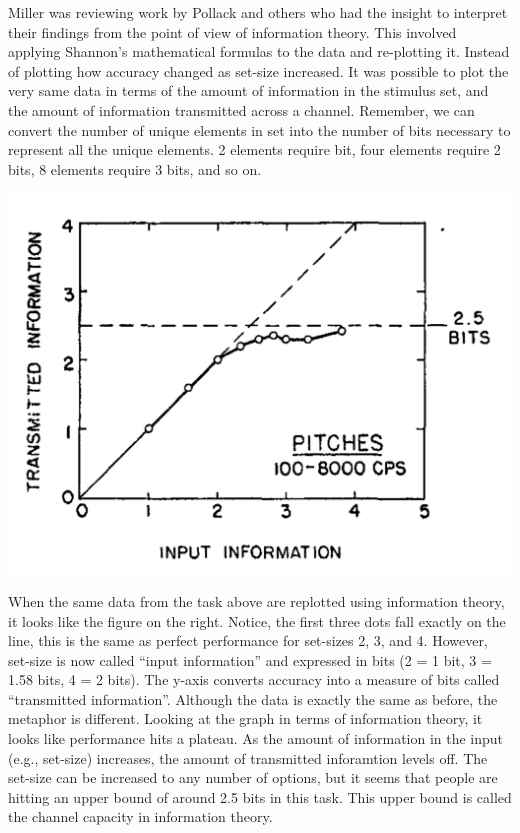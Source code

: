 \documentclass[
  oneside,
  12pt]{crumpbook}
\newenvironment{floatright50}{%
  \wrapfigure{R}{.5\textwidth}%
  }{%
  \endwrapfigure}
\begin{document}
Miller was reviewing work by Pollack and others who had the insight to interpret their findings from the point of view of information theory. This involved applying Shannon's mathematical formulas to the data and re-plotting it. Instead of plotting how accuracy changed as set-size increased. It was possible to plot the very same data in terms of the amount of information in the stimulus set, and the amount of information transmitted across a channel. Remember, we can convert the number of unique elements in set into the number of bits necessary to represent all the unique elements. 2 elements require bit, four elements require 2 bits, 8 elements require 3 bits, and so on.

\begin{floatright50}
\includegraphics[width=1\linewidth]{imgs/Miller_tone}

\end{floatright50}

When the same data from the task above are replotted using information theory, it looks like the figure on the right. Notice, the first three dots fall exactly on the line, this is the same as perfect performance for set-sizes 2, 3, and 4. However, set-size is now called ``input information'' and expressed in bits (2 = 1 bit, 3 = 1.58 bits, 4 = 2 bits). The y-axis converts accuracy into a measure of bits called ``transmitted information''. Although the data is exactly the same as before, the metaphor is different. Looking at the graph in terms of information theory, it looks like performance hits a plateau. As the amount of information in the input (e.g., set-size) increases, the amount of transmitted inforamtion levels off. The set-size can be increased to any number of options, but it seems that people are hitting an upper bound of around 2.5 bits in this task. This upper bound is called the channel capacity in information theory.
\end{document}
